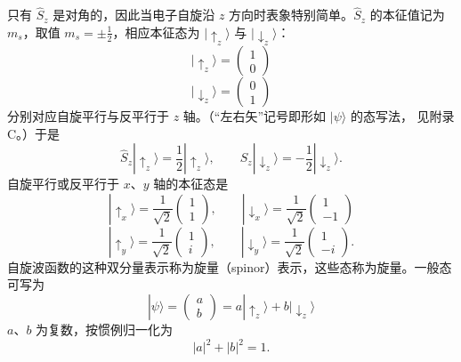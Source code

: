 只有 $\hat{S}_z$ 是对角的，因此当电子自旋沿 $z$ 方向时表象特别简单。$\hat{S}_z$
的本征值记为 $m_s$，取值 $m_s=\pm\frac{1}{2}$，相应本征态为 $|\!\uparrow_z\rangle$
与 $|\!\downarrow_z\rangle$：
\begin{equation*}
|\!\uparrow_z\rangle = \begin{pmatrix}1\\0\end{pmatrix}\tag{1.44}
\end{equation*}
\begin{equation*}
|\!\downarrow_z\rangle = \begin{pmatrix}0\\1\end{pmatrix}\tag{1.45}
\end{equation*}
分别对应自旋平行与反平行于 $z$ 轴。（“左右矢”记号即形如 $|\psi\rangle$ 的态写法，
见附录 C。）于是
\begin{equation*}
\hat{S}_z|\!\uparrow_z\rangle = \frac{1}{2}|\!\uparrow_z\rangle,\qquad
\hat{S}_z|\!\downarrow_z\rangle = -\frac{1}{2}|\!\downarrow_z\rangle.\tag{1.46}
\end{equation*}
自旋平行或反平行于 $x$、$y$ 轴的本征态是
\begin{equation*}
|\!\uparrow_x\rangle = \frac{1}{\sqrt{2}}\begin{pmatrix}1\\1\end{pmatrix},\qquad
|\!\downarrow_x\rangle = \frac{1}{\sqrt{2}}\begin{pmatrix}1\\-1\end{pmatrix}\tag{1.47}
\end{equation*}
\begin{equation*}
|\!\uparrow_y\rangle = \frac{1}{\sqrt{2}}\begin{pmatrix}1\\i\end{pmatrix},\qquad
|\!\downarrow_y\rangle = \frac{1}{\sqrt{2}}\begin{pmatrix}1\\-i\end{pmatrix}.\tag{1.48}
\end{equation*}
自旋波函数的这种双分量表示称为旋量（spinor）表示，这些态称为旋量。一般态可写为
\begin{equation*}
|\psi\rangle = \begin{pmatrix}a\\b\end{pmatrix} = a|\!\uparrow_z\rangle + b|\!\downarrow_z\rangle\tag{1.49}
\end{equation*}
$a$、$b$ 为复数，按惯例归一化为
\begin{equation*}
|a|^{2} + |b|^{2} = 1.\tag{1.50}
\end{equation*}

